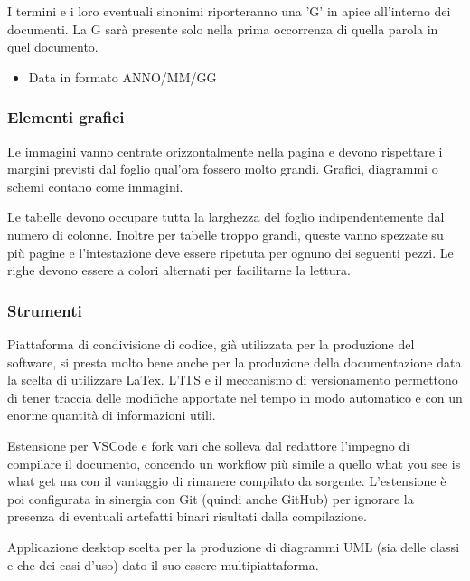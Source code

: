     I termini e i loro eventuali sinonimi riporteranno una 'G' in apice all'interno dei documenti. La G sarà
    presente solo nella prima occorrenza di quella parola in quel documento.

    \begin{itemize}
    \item Data in formato ANNO/MM/GG
    \end{itemize}

\subsubsection{Elementi grafici}

    Le immagini vanno centrate orizzontalmente nella pagina e devono rispettare i margini previsti dal foglio qual'ora
    fossero molto grandi.
    Grafici, diagrammi o schemi contano come immagini.

    Le tabelle devono occupare tutta la larghezza del foglio indipendentemente dal numero di colonne.
    Inoltre per tabelle troppo grandi, queste vanno spezzate su più pagine e l'intestazione deve essere ripetuta
    per ognuno dei seguenti pezzi.
    Le righe devono essere a colori alternati per facilitarne la lettura.

\subsubsection{Strumenti}

    Piattaforma di condivisione di codice, già utilizzata per la produzione del software, si presta
    molto bene anche per la produzione della documentazione data la scelta di utilizzare LaTex.
    L'ITS e il meccanismo di versionamento permettono di tener traccia delle modifiche apportate nel tempo
    in modo automatico e con un enorme quantità di informazioni utili.

    Estensione per VSCode e fork vari che solleva dal redattore l'impegno di compilare il documento, concendo un workflow più simile
    a quello what you see is what get ma con il vantaggio di rimanere compilato da sorgente.
    L'estensione è poi configurata in sinergia con Git (quindi anche GitHub) per ignorare la presenza di eventuali artefatti binari
    risultati dalla compilazione.

    Applicazione desktop scelta per la produzione di diagrammi UML (sia delle classi e che dei casi d'uso) dato il suo essere
    multipiattaforma.
